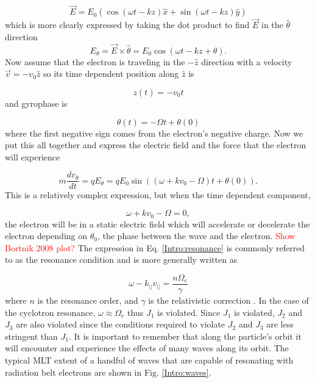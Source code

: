\begin{equation}
\vec{E} = E_0 (\cos{(\omega t - kz)}\hat{x} + \sin{(\omega t - kz)}\hat{y}) 
\end{equation} which is more clearly expressed by taking the dot product to find $\vec{E}$ in the $\hat{\theta}$ direction
\begin{equation}
E_\theta = \vec{E} \times \hat{\theta} = E_0 \cos{(\omega t - kz + \theta)}.
\end{equation} Now assume that the electron is traveling in the $-\hat{z}$ direction with a velocity $\vec{v} = -v_0 \hat{z}$ so its time dependent position along $\hat{z}$ is

\begin{equation}
z(t) = -v_0 t
\end{equation} and gyrophase is

\begin{equation}
\theta(t) = -\Omega t + \theta(0)
\end{equation} where the first negative sign comes from the electron's negative charge. Now we put this all together and express the electric field and the force that the electron will experience

\begin{equation}
m \frac{dv_\theta}{dt} = qE_\theta = qE_0 \sin{((\omega + kv_0 - \Omega)t + \theta(0))}.
\end{equation} This is a relatively complex expression, but when the time dependent component, 

\begin{equation} \label{Intro:resonance}
\omega + kv_0 - \Omega = 0,
\end{equation} the electron will be in a static electric field which will accelerate or decelerate the electron depending on $\theta_0$, the phase between the wave and the electron. \textcolor{red}{Show Bortnik 2008 plot?} The expression in Eq. \ref{Intro:resonance} is commonly referred to as the resonance condition and is more generally written as 

\begin{equation} \label{Intro:resonance_general}
\omega - k_{||} v_{||} = \frac{n \Omega_e}{\gamma}
\end{equation} where $n$ is the resonance order, and $\gamma$ is the relativistic correction \citep[e.g.][]{Millan2007}. In the case of the cyclotron resonance, $\omega \approx \Omega_e$ thus $J_1$ is violated. Since $J_1$ is violated, $J_2$ and $J_3$ are also violated since the conditions required to violate $J_2$ and $J_3$ are less stringent than $J_1$. It is important to remember that along the particle's orbit it will encounter and experience the effects of many waves along its orbit. The typical MLT extent of a handful of waves that are capable of resonating with radiation belt electrons are shown in Fig. \ref{Intro:waves}.

